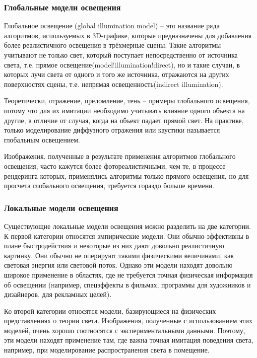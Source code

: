 \documentclass[12pt, a4paper, utf8]{article}
\begin{document}
\subsubsection{Глобальные модели освещения}

Глобальное освещение (global illumination model) -- это название ряда алгоритмов, используемых в 3D-графике, которые предназначены для добавления более реалистичного освещения в трёхмерные сцены. Такие алгоритмы учитывают не только свет, который поступает непосредственно от источника света, т.е. прямое освещение(model!illumination!direct), но и такие случаи, в которых лучи света от одного и того же источника, отражаются на других поверхностях сцены, т.е. непрямая освещенность(indirect illumination).

Теоретически, отражение, преломление, тень -- примеры глобального освещения, потому что для их имитации необходимо учитывать влияние одного объекта на другие, в отличие от случая, когда на объект падает прямой свет. На практике, только моделирование диффузного отражения или каустики называется глобальным освещением.

Изображения, полученные в результате применения алгоритмов глобального освещения, часто кажутся более фотореалистичными, чем те, в процессе рендеринга которых, применялись алгоритмы только прямого освещения, но для просчета глобального освещения, требуется гораздо больше времени.

\subsubsection{Локальные модели освещения}

Существующие локальные модели освещения можно разделить на две категории. К первой категории относятся эмпирические модели. Они обычно эффективны в плане быстродействия и некоторые из них дают довольно реалистичную картинку. Они обычно не оперируют такими физическими величинами, как световая энергия или световой поток. Однако эти модели находят довольно широкое применение в областях, где не требуется точная физическая информация об освещении (например, спецэффекты в фильмах, программы для художников и дизайнеров, для рекламных целей).

Ко второй категории относятся модели, базирующиеся на физических представлениях о теории света. Изображения, полученные с использованием этих моделей, очень хорошо соотносятся с экспериментальными данными. Поэтому, эти модели находят применение там, где важна точная имитация поведения света, например, при моделирование распространения света в помещение.
\end{document}

